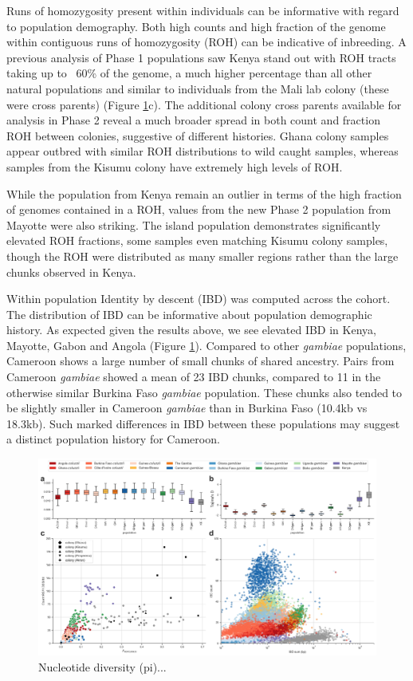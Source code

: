 \documentclass[a4paper,11pt,abstracton,hidelinks]{scrartcl}
\begin{document}
Runs of homozygosity present within individuals can be informative with regard to population demography.
%
Both high counts and high fraction of the genome within contiguous runs of homozygosity (ROH) can be indicative of inbreeding.
%
A previous analysis of Phase 1 populations \cite{Ag1000gConsortium2017} saw Kenya stand out with ROH tracts taking up to ~60\% of the genome, a much higher percentage than all other natural populations and similar to individuals from the  Mali lab colony (these were cross parents) (Figure \ref{div}c). 
%
The additional colony cross parents available for analysis in Phase 2 reveal a much broader spread in both count and fraction ROH between colonies, suggestive of different histories.
%
Ghana colony samples appear outbred with similar ROH distributions to wild caught samples, whereas samples from the Kisumu colony have extremely high levels of ROH.    

While the population from Kenya remain an outlier in terms of the high fraction of genomes contained in a ROH, values from the new Phase 2 population from Mayotte were also striking.
%
The island population demonstrates significantly elevated ROH fractions, some samples even matching Kisumu colony samples, though the ROH were distributed as many smaller regions rather than the large chunks observed in Kenya.

Within population Identity by descent (IBD) was computed across the cohort. 
%
The distribution of IBD can be informative about population demographic history. 
%
As expected given the results above, we see elevated IBD in Kenya, Mayotte, Gabon and Angola (Figure \ref{div}).
%
Compared to other \emph{gambiae} populations, Cameroon shows a large number of small chunks of shared ancestry.
%
Pairs from Cameroon \emph{gambiae} showed a mean of 23 IBD chunks, compared to 11 in the otherwise similar Burkina Faso \emph{gambiae} population.
%
These chunks also tended to be slightly smaller in Cameroon \emph{gambiae} than in Burkina Faso (10.4kb vs 18.3kb). 
%
Such marked differences in IBD between these populations may suggest a distinct population history for Cameroon.


\begin{figure}[H]
	\begin{center}
		\includegraphics*[width=6.3in]{artwork/diversity_composite.jpeg}
	\end{center}
	\caption{Nucleotide diversity (pi)...}
	\label{div}
\end{figure}
\end{document}
